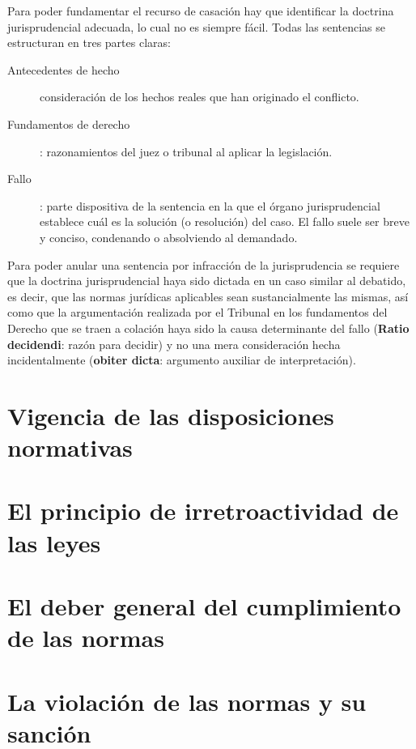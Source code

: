 \documentclass[a4paper,12pt]{report}
\begin{document}
Para poder fundamentar el recurso de casación hay que identificar la doctrina jurisprudencial adecuada, lo cual no es siempre fácil. Todas las sentencias se estructuran en tres partes claras:

\begin{description}
\item[Antecedentes de hecho] consideración de los hechos reales que han originado el conflicto.
\item[Fundamentos de derecho]: razonamientos del juez o tribunal al aplicar la legislación.
\item[Fallo]: parte dispositiva de la sentencia en la que el órgano jurisprudencial establece cuál es la solución (o resolución) del caso. El fallo suele ser breve y conciso, condenando o absolviendo al demandado.
\end{description}

Para poder anular una sentencia por infracción de la jurisprudencia se requiere que la doctrina jurisprudencial haya sido dictada en un caso similar al debatido, es decir, que las normas jurídicas aplicables sean sustancialmente las mismas, así como que la argumentación realizada por el Tribunal en los fundamentos del Derecho que se traen a colación haya sido la causa determinante del fallo (\textbf{Ratio decidendi}: razón para decidir) y no una mera consideración hecha incidentalmente (\textbf{obiter dicta}: argumento auxiliar de interpretación).

\section{Vigencia de las disposiciones normativas}
\section{El principio de irretroactividad de las leyes}
\section{El deber general del cumplimiento de las normas}
\section{La violación de las normas y su sanción}
\end{document}
